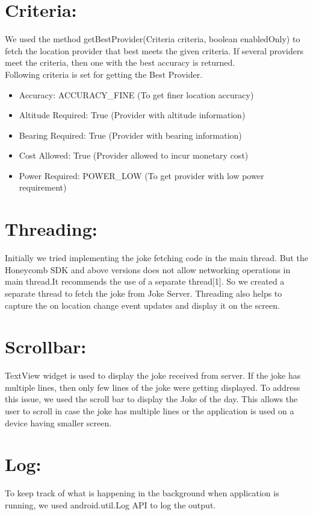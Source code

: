 \documentclass[11pt]{report}
\begin{document}
\section*{Criteria:}
We used the method getBestProvider(Criteria criteria, boolean enabledOnly) to fetch the location provider that best meets the given criteria. If several providers meet the criteria, then one with the best accuracy is returned.
\\[11pt]Following criteria is set for getting the Best Provider.
\begin{itemize}
\item Accuracy: ACCURACY\_FINE   (To get finer location accuracy)
\item Altitude Required: True    (Provider with altitude information)
\item Bearing Required: True     (Provider with bearing information)
\item Cost Allowed: True         (Provider allowed to incur monetary cost)
\item Power Required: POWER\_LOW (To get provider with low power requirement)
\end{itemize}

\section*{Threading:}
Initially we tried implementing the joke fetching code in the main thread. But the Honeycomb SDK and above versions does not allow networking operations in main thread.It recommends the use of a separate thread[1]. So we created a separate thread to fetch the joke from Joke Server. Threading also helps to capture the on location change event updates and display it on the screen.

\section*{Scrollbar:}
TextView widget is used to display the joke received from server. If the joke has multiple lines, then only few lines of the joke were getting displayed. To address this issue, we used the scroll bar to display the Joke of the day. This allows the user to scroll in case the joke has multiple lines or the application is used on a device having smaller screen.

\section*{Log:}
To keep track of what is happening in the background when application is running, we used android.util.Log API to log the output.
\end{document}
